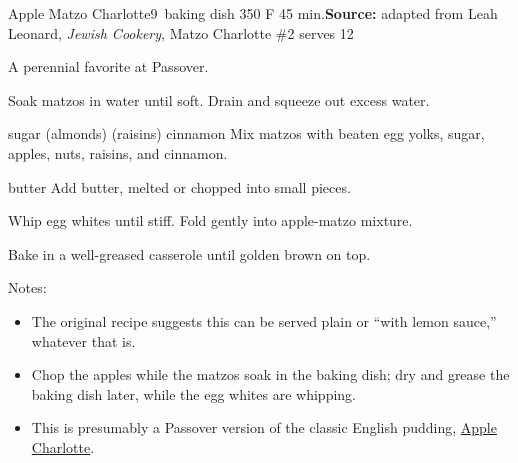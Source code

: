 \begin{recipe}{Apple Matzo Charlotte}{9\inch{}\inch\ baking dish \hfill 350\0 F \hfill 45 min.}{\textbf{Source:} adapted from Leah Leonard, \textit{Jewish Cookery}, Matzo Charlotte \#2 \hfill serves 12}

 \freeform A perennial favorite at Passover.

 Soak matzos in water until soft. Drain and squeeze out excess water.

  {sugar}
  {(almonds)}
  {(raisins)}
  {cinnamon}
 Mix matzos with beaten egg yolks, sugar, apples, nuts, raisins, and cinnamon.

  {butter}
 Add butter, melted or chopped into small pieces.

 Whip egg whites until stiff. Fold gently into apple-matzo mixture.

 \newstep Bake in a well-greased casserole until golden brown on top.

 \freeform Notes:
 \begin{itemize}
  \item The original recipe suggests this can be served plain or ``with lemon sauce,'' whatever that is.
  \item Chop the apples while the matzos soak in the baking dish; dry and grease the baking dish later, while the egg whites are whipping.
  \item This is presumably a Passover version of the classic English pudding, \href{https://www.theguardian.com/food/2020/oct/21/how-to-make-the-perfect-apple-charlotte-recipe}{Apple Charlotte}.
 \end{itemize}
\end{recipe}
